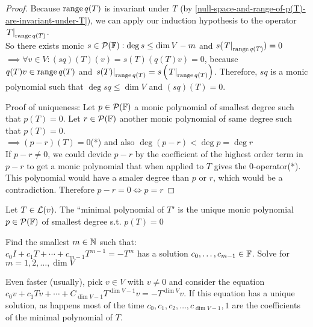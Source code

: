 \begin{proof}
  Because $\operatorname{range} q(T)$ is invariant under $T$ (by \ref{null-space-and-range-of-p(T)-are-invariant-under-T}), we can apply our induction hypothesis to the operator $\left.T\right|_{\operatorname{range} q(T)}$. \\
  So there exists monic $s \in \mathcal{P} (\mathbb{F}): \deg s \leq \dim V - m$ and $s(\left.T\right|_{\operatorname{range} q(T)})=0$ \\
  $\implies \forall v \in V: (sq)(T)(v) = s(T) (q(T)v) = 0$, because $q(T)v \in \operatorname{range} q(T)$ and $\left.s(T)\right|_{\operatorname{range} q(T)}=s\left( \left.T\right|_{\operatorname{range} q(T)} \right )$.
  Therefore, $sq$ is a monic polynomial such that $\deg sq \leq \dim V$ and $(sq)(T)=0$.

  Proof of uniqueness: Let $p\in \mathcal{P} (\mathbb{F})$ a monic polynomial of smallest degree such that $p(T)=0$. Let $r\in \mathcal{P} ( \mathbb{F})$ another monic polynomial of same degree such that $p(T)=0$. \\
  $\implies (p-r) (T) = 0$(*) and also $\deg (p-r) < \deg p = \deg r$ \\
  If $p-r \neq 0$, we could devide $p-r$ by the coefficient of the highest order term in $p-r$ to get a monic polynomial that when applied to $T$ gives the $0$-operator(*). This polynomial would have a smaler degree than $p$ or $r$, which would be a contradiction. Therefore $p-r=0 \iff p = r$
\end{proof}

\setcounter{thm}{23}

\begin{mydef}
  Let $T\in \mathcal{L} (v)$. The ``minimal polynomial of $T$" is the unique monic polynomial $p\in \mathcal{P}(\mathbb{F})$ of smallest degree s.t. $p(T)=0$
\end{mydef}
 Find the smallest $m \in \mathbb{N}$ such that: \\
$c_0I + c_1 T + \cdots + c_{m-1} T^{m-1} = -T^{m}$ has a solution $c_0, \dots, c_{m-1} \in \mathbb{F}$. Solve for $m=1,2,\dots,\dim V$

Even faster (usually), pick $v \in V$ with $v \neq 0$ and consider the equation $c_0v + c_1Tv + \cdots + C_{\dim V-1}T^{\dim V-1}v=-T^{\dim V}v$.
If this equation has a unique solution, as happens most of the time $c_0, c_1, c_2, \dots, c_{\dim V-1}, 1$ are the coefficients of the minimal polynomial of $T$.

